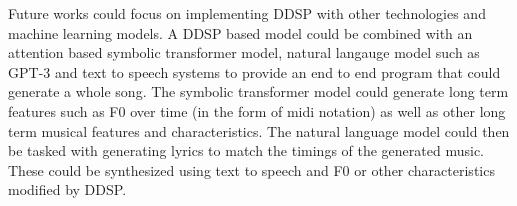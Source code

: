 Future works could focus on implementing DDSP with other technologies and machine learning models. A DDSP based model could be combined with an attention based symbolic transformer model, natural langauge model such as GPT-3\cite{GPT3} and text to speech systems to provide an end to end program that could generate a whole song. The symbolic transformer model could generate long term features such as F0 over time (in the form of midi notation) as well as other long term musical features and characteristics. The natural language model could then be tasked with generating lyrics to match the timings of the generated music. These could be synthesized using text to speech and F0 or other characteristics modified by DDSP.